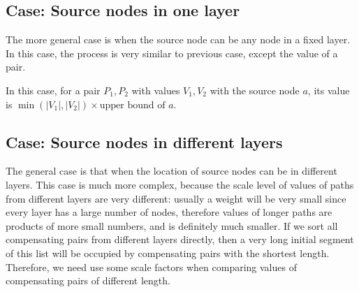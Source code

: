 \documentclass{llncs}
\begin{document}
\subsection*{Case: Source nodes in one layer}

The more general case is when the source node can be any node in a fixed layer. In this case, the process is very similar to previous case, except the value of a pair.

In this case, for a pair $P_1,P_2$ with values $V_1,V_2$ with the source node $a$, its value is $\min(|V_1|,|V_2|)\times \text{upper bound of } a$.

%
%
%
%
%
%
%
%
%







\subsection*{Case: Source nodes in different layers}

The general case is that when the location of source nodes can be in different layers. This case is much more complex, because the scale level of values of paths from different layers are very different: usually a weight will be very small since every layer has a large number of nodes, therefore values of longer paths are products of more small numbers, and is definitely much smaller. If we sort all compensating pairs from different layers directly, then a very long initial segment of this list will be occupied by compensating pairs with the shortest length. Therefore, we need use some scale factors when comparing values of compensating pairs of different length.
\end{document}
